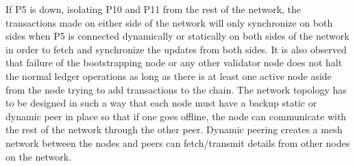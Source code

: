 If P5 is down, isolating P10 and P11 from the rest of the network, the transactions made on either side of the network will only synchronize on both sides when P5 is connected dynamically or statically on both sides of the network in order to fetch and synchronize the updates from both sides. It is also observed that failure of the bootstrapping node or any other validator node does not halt the normal ledger operations as long as there is at least one active node aside from the node trying to add transactions to the chain. The network topology has to be designed in such a way that each node must have a backup static or dynamic peer in place so that if one goes offline, the node can communicate with the rest of the network through the other peer. Dynamic peering creates a mesh network between the nodes and peers can fetch/transmit details from other nodes on the network.
